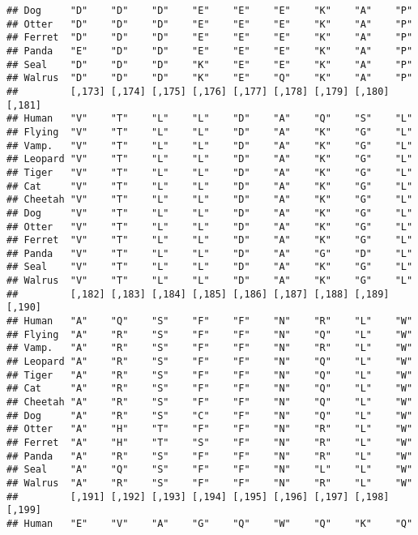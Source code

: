 \documentclass[]{article}
\begin{document}
\begin{verbatim}
## Dog     "D"    "D"    "D"    "E"    "E"    "E"    "K"    "A"    "P"   
## Otter   "D"    "D"    "D"    "E"    "E"    "E"    "K"    "A"    "P"   
## Ferret  "D"    "D"    "D"    "E"    "E"    "E"    "K"    "A"    "P"   
## Panda   "E"    "D"    "D"    "E"    "E"    "E"    "K"    "A"    "P"   
## Seal    "D"    "D"    "D"    "K"    "E"    "E"    "K"    "A"    "P"   
## Walrus  "D"    "D"    "D"    "K"    "E"    "Q"    "K"    "A"    "P"   
##         [,173] [,174] [,175] [,176] [,177] [,178] [,179] [,180] [,181]
## Human   "V"    "T"    "L"    "L"    "D"    "A"    "Q"    "S"    "L"   
## Flying  "V"    "T"    "L"    "L"    "D"    "A"    "K"    "G"    "L"   
## Vamp.   "V"    "T"    "L"    "L"    "D"    "A"    "K"    "G"    "L"   
## Leopard "V"    "T"    "L"    "L"    "D"    "A"    "K"    "G"    "L"   
## Tiger   "V"    "T"    "L"    "L"    "D"    "A"    "K"    "G"    "L"   
## Cat     "V"    "T"    "L"    "L"    "D"    "A"    "K"    "G"    "L"   
## Cheetah "V"    "T"    "L"    "L"    "D"    "A"    "K"    "G"    "L"   
## Dog     "V"    "T"    "L"    "L"    "D"    "A"    "K"    "G"    "L"   
## Otter   "V"    "T"    "L"    "L"    "D"    "A"    "K"    "G"    "L"   
## Ferret  "V"    "T"    "L"    "L"    "D"    "A"    "K"    "G"    "L"   
## Panda   "V"    "T"    "L"    "L"    "D"    "A"    "G"    "D"    "L"   
## Seal    "V"    "T"    "L"    "L"    "D"    "A"    "K"    "G"    "L"   
## Walrus  "V"    "T"    "L"    "L"    "D"    "A"    "K"    "G"    "L"   
##         [,182] [,183] [,184] [,185] [,186] [,187] [,188] [,189] [,190]
## Human   "A"    "Q"    "S"    "F"    "F"    "N"    "R"    "L"    "W"   
## Flying  "A"    "R"    "S"    "F"    "F"    "N"    "Q"    "L"    "W"   
## Vamp.   "A"    "R"    "S"    "F"    "F"    "N"    "R"    "L"    "W"   
## Leopard "A"    "R"    "S"    "F"    "F"    "N"    "Q"    "L"    "W"   
## Tiger   "A"    "R"    "S"    "F"    "F"    "N"    "Q"    "L"    "W"   
## Cat     "A"    "R"    "S"    "F"    "F"    "N"    "Q"    "L"    "W"   
## Cheetah "A"    "R"    "S"    "F"    "F"    "N"    "Q"    "L"    "W"   
## Dog     "A"    "R"    "S"    "C"    "F"    "N"    "Q"    "L"    "W"   
## Otter   "A"    "H"    "T"    "F"    "F"    "N"    "R"    "L"    "W"   
## Ferret  "A"    "H"    "T"    "S"    "F"    "N"    "R"    "L"    "W"   
## Panda   "A"    "R"    "S"    "F"    "F"    "N"    "R"    "L"    "W"   
## Seal    "A"    "Q"    "S"    "F"    "F"    "N"    "L"    "L"    "W"   
## Walrus  "A"    "R"    "S"    "F"    "F"    "N"    "R"    "L"    "W"   
##         [,191] [,192] [,193] [,194] [,195] [,196] [,197] [,198] [,199]
## Human   "E"    "V"    "A"    "G"    "Q"    "W"    "Q"    "K"    "Q"   

\end{verbatim}
\end{document}
